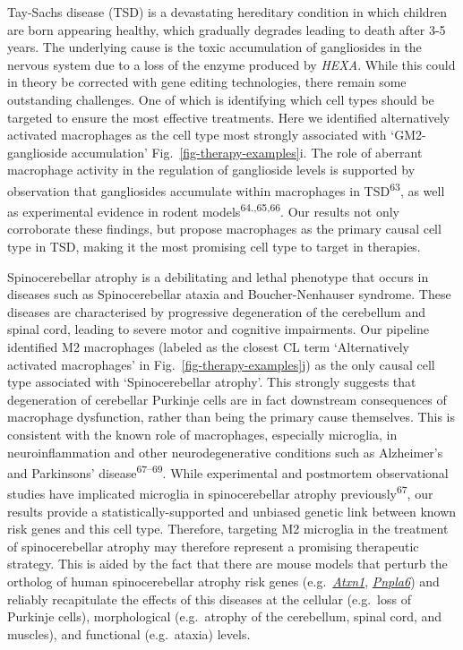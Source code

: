 \documentclass[
]{article}
\begin{document}
Tay-Sachs disease (TSD) is a devastating hereditary condition in which
children are born appearing healthy, which gradually degrades leading to
death after 3-5 years. The underlying cause is the toxic accumulation of
gangliosides in the nervous system due to a loss of the enzyme produced
by \emph{HEXA}. While this could in theory be corrected with gene
editing technologies, there remain some outstanding challenges. One of
which is identifying which cell types should be targeted to ensure the
most effective treatments. Here we identified alternatively activated
macrophages as the cell type most strongly associated with
`GM2-ganglioside accumulation' Fig.~\ref{fig-therapy-examples}i. The
role of aberrant macrophage activity in the regulation of ganglioside
levels is supported by observation that gangliosides accumulate within
macrophages in TSD\textsuperscript{63}, as well as experimental evidence
in rodent models\textsuperscript{64.,65,66}. Our results not only
corroborate these findings, but propose macrophages as the primary
causal cell type in TSD, making it the most promising cell type to
target in therapies.

Spinocerebellar atrophy is a debilitating and lethal phenotype that
occurs in diseases such as Spinocerebellar ataxia and Boucher-Nenhauser
syndrome. These diseases are characterised by progressive degeneration
of the cerebellum and spinal cord, leading to severe motor and cognitive
impairments. Our pipeline identified M2 macrophages (labeled as the
closest CL term `Alternatively activated macrophages' in
Fig.~\ref{fig-therapy-examples}j) as the only causal cell type
associated with `Spinocerebellar atrophy'. This strongly suggests that
degeneration of cerebellar Purkinje cells are in fact downstream
consequences of macrophage dysfunction, rather than being the primary
cause themselves. This is consistent with the known role of macrophages,
especially microglia, in neuroinflammation and other neurodegenerative
conditions such as Alzheimer's and Parkinsons'
disease\textsuperscript{67--69}. While experimental and postmortem
observational studies have implicated microglia in spinocerebellar
atrophy previously\textsuperscript{67}, our results provide a
statistically-supported and unbiased genetic link between known risk
genes and this cell type. Therefore, targeting M2 microglia in the
treatment of spinocerebellar atrophy may therefore represent a promising
therapeutic strategy. This is aided by the fact that there are mouse
models that perturb the ortholog of human spinocerebellar atrophy risk
genes
(e.g.~\href{https://www.informatics.jax.org/marker/MGI:104783}{\emph{Atxn1}},
\href{https://www.informatics.jax.org/marker/MGI:1354723}{\emph{Pnpla6}})
and reliably recapitulate the effects of this diseases at the cellular
(e.g.~loss of Purkinje cells), morphological (e.g.~atrophy of the
cerebellum, spinal cord, and muscles), and functional (e.g.~ataxia)
levels.
\end{document}
